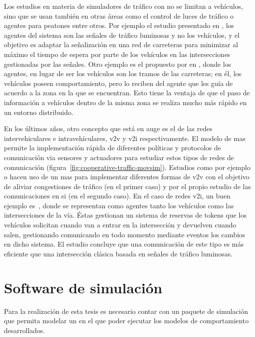 Los estudios en materia de simuladores de tráfico con  no se limitan a vehículos, sino que se usan también en otras áreas como el control de luces de tráfico o agentes para peatones entre otros. Por ejemplo el estudio presentado en \cite{Clymer2002}, los agentes del sistema son las señales de tráfico luminosas y no los vehículos, y el objetivo es adaptar la señalización en una red de carreteras para minimizar al máximo el tiempo de espera por parte de los vehículos en las intersecciones gestionadas por las señales. Otro ejemplo es el propuesto por en \cite{Galis2000}, donde los agentes, en lugar de ser los vehículos son los tramos de las carreteras; en él, los vehículos poseen comportamiento, pero lo reciben del agente que les guía de acuerdo a la zona en la que se encuentran. Esto tiene la ventaja de que el paso de información a vehículos dentro de la misma zona se realiza mucho más rápido en un entorno distribuido.

En los últimos años, otro concepto que está en auge es el de las redes intervehiculares e intravehículares, \gls{v2v} y \gls{v2i} respectivamente. El modelo de \gls{mas} permite la implementación rápida de diferentes políticas y protocolos de comunicación via sensores y actuadores para estudiar estos tipos de redes de comunicación (figura~\ref{fig:cooperative-traffic-movsim}). Estudios como por ejemplo \cite{Shiose2001} o \cite{Galis2000} hacen uso de un \ac{mas} para implementar diferentes formas de \ac{v2v} con el objetivo de aliviar congestiones de tráfico (en el primer caso) y por el propio estudio de las comunicaciones en si (en el segundo caso). En el caso de redes \ac{v2i}, un buen ejemplo es~\cite{Dresner2004}, donde se representan como agentes tanto los vehículos como las intersecciones de la vía. Éstas gestionan un sistema de reservas de tokens que los vehículos solicitan cuando van a entrar en la intersección y devuelven cuando salen, gestionando  comunicando en todo momento mediante eventos los cambios en dicho sistema. El estudio concluye que una comunicación de este tipo es más eficiente que una intersección clásica basada en señales de tráfico luminosas.

\section{Software de simulación}

Para la realización de esta tesis es necesario contar con un paquete de simulación que permita modelar un  en el que poder ejecutar los modelos de comportamiento desarrollados.

